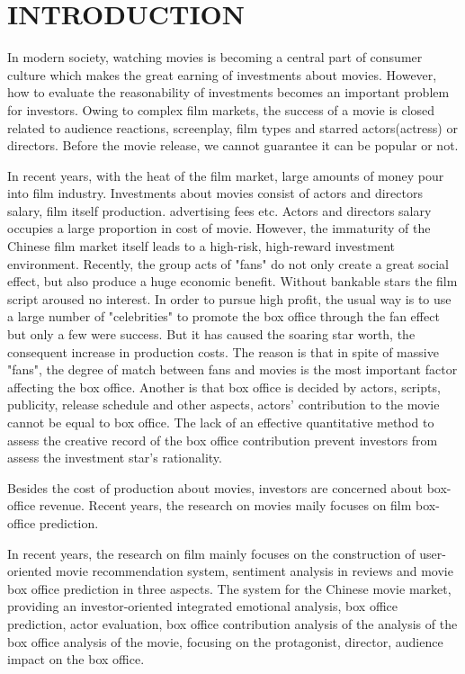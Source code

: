 \section{INTRODUCTION}
\par In modern society, watching movies is becoming a central part of consumer culture which makes the great earning of investments about movies. However, how to evaluate the reasonability of investments becomes an important problem for investors. Owing to complex film markets,  the success of a movie is closed related to audience reactions, screenplay, film types and starred actors(actress) or directors.  Before the movie release, we cannot guarantee it can be popular or not.
\par In recent years, with the heat of the film market, large amounts of money pour into film industry. Investments about movies consist of actors and directors salary,  film itself production. advertising fees etc. Actors and directors salary occupies a large proportion in cost of movie. However, the immaturity of the Chinese film market itself leads to a high-risk, high-reward investment environment.  Recently, the group acts of "fans" do not only create a great social effect, but also produce a huge economic benefit. Without bankable stars the film script aroused no interest. In order to pursue high profit, the usual way is to use a large number of "celebrities" to promote the box office through the fan effect but only a few were success. But it has caused the soaring star worth, the consequent increase in production costs. The reason is that in spite of massive "fans", the degree of match between fans and movies is the most important factor affecting the box office. Another is that box office is decided by actors, scripts, publicity, release schedule and other aspects, actors' contribution to the movie cannot be equal to box office. The lack of an effective quantitative method to assess the creative record of the box office contribution prevent investors from assess the investment star's rationality.
\par Besides the cost of production about movies, investors are concerned about box-office revenue. Recent years, the research on movies maily focuses on film box-office prediction\cite{marshall2013forecasting,basuroy2003critical,asur2010predicting}.

\par In recent years, the research on film mainly focuses on the construction of user-oriented movie recommendation system\cite{diao2014jointly,tang2015user}, sentiment analysis in reviews\cite{manek2017aspect,kiritchenko2014sentiment,pang2008opinion} and movie box office prediction\cite{marshall2013forecasting,basuroy2003critical,asur2010predicting} in three aspects.
The system for the Chinese movie market, providing an investor-oriented integrated emotional analysis, box office prediction, actor evaluation, box office contribution analysis of the analysis of the box office analysis of the movie, focusing on the protagonist, director, audience impact on the box office.
